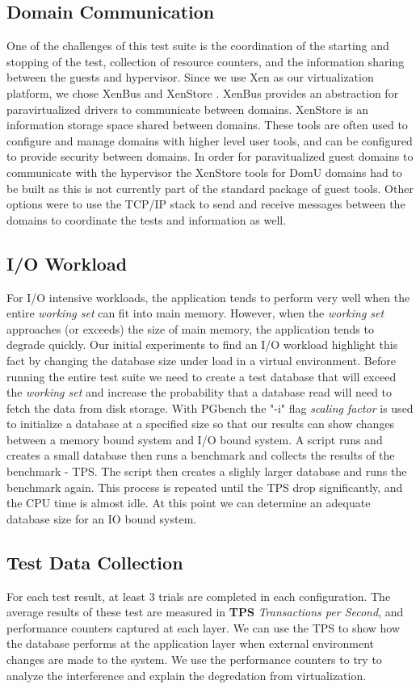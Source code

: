 \subsection{Domain Communication}
\indent One of the challenges of this test suite is the coordination of the starting and stopping of the test, collection of resource counters, and the information sharing between the guests and hypervisor.  
Since we use Xen as our virtualization platform, we chose XenBus and XenStore \cite{xenbus}. 
XenBus provides an abstraction for paravirtualized drivers to communicate between domains.  
XenStore is an information storage space shared between domains.  
These tools are often used to configure and manage domains with higher level user tools, and can be configured to provide security between domains.
In order for paravitualized guest domains to communicate with the hypervisor the XenStore tools for DomU domains had to be built as this is not currently part of the standard package of guest tools.  Other options were to use the TCP/IP stack to send and receive messages between the domains to coordinate the tests and information as well.

\subsection{I/O Workload}
For I/O intensive workloads, the application tends to perform very well when the entire \emph{working set} can fit into main memory.  
However, when the \emph{working set}  approaches (or exceeds) the size of main memory, the application tends to degrade quickly.  
Our initial experiments to find an I/O workload highlight this fact by changing the database size under load in a virtual environment.
Before running the entire test suite we need to create a test database that will exceed the \emph{working set} and increase the probability that a database read will need to fetch the data from disk storage.  With PGbench the "-i" flag \emph{scaling factor} is used to initialize a database at a specified size so that our results can show changes between a memory bound system and I/O bound system.  
A script runs and creates a small database then runs a benchmark and collects the results of the benchmark - TPS.  The script then creates a slighly larger database and runs the benchmark again.  This process is repeated until the TPS drop significantly, and the CPU time is almost idle.  At this point we can determine an adequate database size for an IO bound system.

\subsection{Test Data Collection}
\indent For each test result, at least 3 trials are completed in each configuration.  The average results of these test are measured in \textbf{TPS} \emph{Transactions per Second}, and performance counters captured at each layer.   
We can use the TPS to show how the database performs at the application layer when external environment changes are made to the system.  We use the performance counters to try to analyze the interference and explain the degredation from virtualization.

